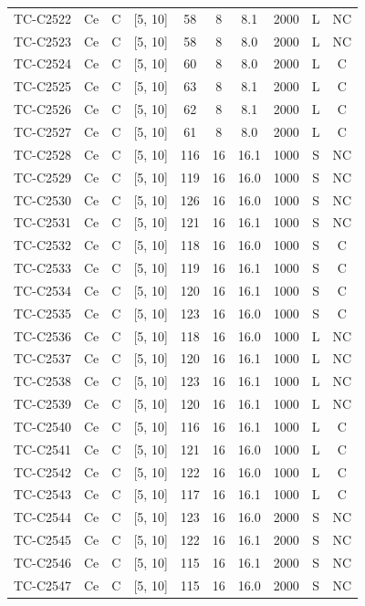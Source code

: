 \begin{longtable}{lccccccccc}
TC-C2522 & Ce & C & [5, 10] & 58 & 8 & 8.1 & 2000 & L & NC \\
TC-C2523 & Ce & C & [5, 10] & 58 & 8 & 8.0 & 2000 & L & NC \\
TC-C2524 & Ce & C & [5, 10] & 60 & 8 & 8.0 & 2000 & L & C \\
TC-C2525 & Ce & C & [5, 10] & 63 & 8 & 8.1 & 2000 & L & C \\
TC-C2526 & Ce & C & [5, 10] & 62 & 8 & 8.1 & 2000 & L & C \\
TC-C2527 & Ce & C & [5, 10] & 61 & 8 & 8.0 & 2000 & L & C \\
TC-C2528 & Ce & C & [5, 10] & 116 & 16 & 16.1 & 1000 & S & NC \\
TC-C2529 & Ce & C & [5, 10] & 119 & 16 & 16.0 & 1000 & S & NC \\
TC-C2530 & Ce & C & [5, 10] & 126 & 16 & 16.0 & 1000 & S & NC \\
TC-C2531 & Ce & C & [5, 10] & 121 & 16 & 16.1 & 1000 & S & NC \\
TC-C2532 & Ce & C & [5, 10] & 118 & 16 & 16.0 & 1000 & S & C \\
TC-C2533 & Ce & C & [5, 10] & 119 & 16 & 16.1 & 1000 & S & C \\
TC-C2534 & Ce & C & [5, 10] & 120 & 16 & 16.1 & 1000 & S & C \\
TC-C2535 & Ce & C & [5, 10] & 123 & 16 & 16.0 & 1000 & S & C \\
TC-C2536 & Ce & C & [5, 10] & 118 & 16 & 16.0 & 1000 & L & NC \\
TC-C2537 & Ce & C & [5, 10] & 120 & 16 & 16.1 & 1000 & L & NC \\
TC-C2538 & Ce & C & [5, 10] & 123 & 16 & 16.1 & 1000 & L & NC \\
TC-C2539 & Ce & C & [5, 10] & 120 & 16 & 16.1 & 1000 & L & NC \\
TC-C2540 & Ce & C & [5, 10] & 116 & 16 & 16.1 & 1000 & L & C \\
TC-C2541 & Ce & C & [5, 10] & 121 & 16 & 16.0 & 1000 & L & C \\
TC-C2542 & Ce & C & [5, 10] & 122 & 16 & 16.0 & 1000 & L & C \\
TC-C2543 & Ce & C & [5, 10] & 117 & 16 & 16.1 & 1000 & L & C \\
TC-C2544 & Ce & C & [5, 10] & 123 & 16 & 16.0 & 2000 & S & NC \\
TC-C2545 & Ce & C & [5, 10] & 122 & 16 & 16.1 & 2000 & S & NC \\
TC-C2546 & Ce & C & [5, 10] & 115 & 16 & 16.1 & 2000 & S & NC \\
TC-C2547 & Ce & C & [5, 10] & 115 & 16 & 16.0 & 2000 & S & NC \\

\end{longtable}
